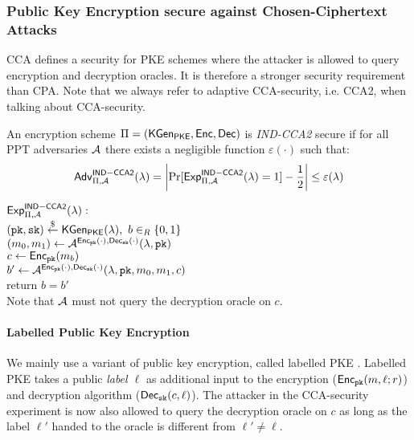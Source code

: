 \subsubsection{Public Key Encryption secure against Chosen-Ciphertext Attacks}
\ac{CCA} defines a security for \ac{PKE} schemes where the attacker is allowed to query encryption and decryption oracles.
It is therefore a stronger security requirement than \ac{CPA}.
Note that we always refer to adaptive \ac{CCA}-security, i.e. \ac{CCA}2, when talking about \ac{CCA}-security.

\begin{definition}\label{def:indcca2}
An encryption scheme $\Pi=(\mathsf{KGen_{PKE}},\mathsf{Enc},\mathsf{Dec})$ is \emph{IND-CCA2} secure if for all \ac{PPT} adversaries $\mathcal{A}$ there exists a negligible function $\varepsilon(\cdot)$ such that:
\[\mathsf{Adv}_{\Pi,\mathcal{A}}^{\mathsf{IND-CCA2}}(\lambda)=\left|\Pr[\mathsf{Exp}^{\mathsf{IND-CCA2}}_{\Pi,\mathcal{A}}(\lambda)=1]-\frac12\right|\leq\varepsilon(\lambda)\]

\noindent
$\mathsf{Exp}^{\mathsf{IND-CCA2}}_{\Pi,\mathcal{A}}(\lambda):$\\
\hspace*{2em}$(\mathtt{pk},\mathtt{sk})\stackrel{\$}{\gets}\mathsf{KGen_{PKE}}(\lambda),~b\in_R\{0,1\}$\\
\hspace*{2em}$(m_0,m_1)\gets\mathcal{A}^{\mathsf{Enc}_\mathtt{pk}(\cdot),\mathsf{Dec}_\mathtt{sk}(\cdot)}(\lambda,\mathtt{pk})$\\
\hspace*{2em}$c\gets\mathsf{Enc}_\mathtt{pk}(m_b)$\\
\hspace*{2em}$b'\gets\mathcal{A}^{\mathsf{Enc}_\mathtt{pk}(\cdot),\mathsf{Dec}_\mathtt{sk}(\cdot)}(\lambda,\mathtt{pk},m_0,m_1,c)$\\
\hspace*{2em}return $b=b'$\\
Note that $\mathcal{A}$ must not query the decryption oracle on $c$.
\eod
\end{definition}

\paragraph{Labelled Public Key Encryption}
We mainly use a variant of public key encryption, called labelled \ac{PKE} \cite{Shoup01,Canetti2005}.
Labelled \ac{PKE} takes a public \emph{label $\ell$} as additional input to the encryption ($\mathsf{Enc}_\mathtt{pk}(m,\ell; r)$) and decryption algorithm ($\mathsf{Dec}_\mathtt{sk}(c,\ell)$).
The attacker in the \ac{CCA}-security experiment is now also allowed to query the decryption oracle on $c$ as long as the label $\ell'$ handed to the oracle is different from $\ell'\not=\ell$.



